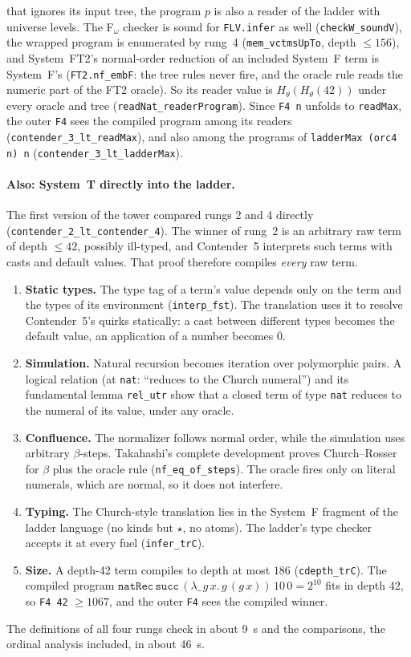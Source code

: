 \documentclass[11pt]{article}
\theoremstyle{definition}
\theoremstyle{remark}
\newcommand{\lean}[1]{\texttt{#1}}
\begin{document}
that ignores its input tree, the program $p$ is also a reader of the ladder
with universe levels. The F$_\omega$ checker is sound for \lean{FLV.infer} as
well (\lean{checkW\_soundV}), the wrapped program is enumerated by rung~4
(\lean{mem\_vctmsUpTo}, depth $\le156$), and System~FT2's normal-order reduction
of an included System~F term is System~F's (\lean{FT2.nf\_embF}: the tree rules
never fire, and the oracle rule reads the numeric part of the FT2 oracle). So
its reader value is $H_\theta(H_\theta(42))$ under every oracle and tree
(\lean{readNat\_readerProgram}). Since \lean{F4 n} unfolds to \lean{readMax},
the outer \lean{F4} sees the compiled program among its readers
(\lean{contender\_3\_lt\_readMax}), and also among the programs of
\lean{ladderMax (orc4 n) n} (\lean{contender\_3\_lt\_ladderMax}).

\paragraph{Also: System~T directly into the ladder.} The first version of the
tower compared rungs 2 and 4 directly (\lean{contender\_2\_lt\_contender\_4}).
The winner of rung~2 is an arbitrary raw term of depth $\le 42$, possibly
ill-typed, and Contender~5 interprets such terms with casts and default values.
That proof therefore compiles \emph{every} raw term.
\begin{enumerate}[leftmargin=*]
\item \textbf{Static types.} The type tag of a term's value depends only on
  the term and the types of its environment (\lean{interp\_fst}). The
  translation uses it to resolve Contender~5's quirks statically: a cast
  between different types becomes the default value, an application of a
  number becomes $\overline{0}$.
\item \textbf{Simulation.} Natural recursion becomes iteration over
  polymorphic pairs. A logical relation (at \lean{nat}: ``reduces to the
  Church numeral'') and its fundamental lemma \lean{rel\_utr} show that a
  closed term of type \lean{nat} reduces to the numeral of its value, under any
  oracle.
\item \textbf{Confluence.} The normalizer follows normal order, while the
  simulation uses arbitrary $\beta$-steps. Takahashi's complete development proves
  Church--Rosser for $\beta$ plus the oracle rule (\lean{nf\_eq\_of\_steps}). The
  oracle fires only on literal numerals, which are normal, so it does not
  interfere.
\item \textbf{Typing.} The Church-style translation lies in the System~F
  fragment of the ladder language (no kinds but $\star$, no atoms). The
  ladder's type checker accepts it at every fuel (\lean{infer\_trC}).
\item \textbf{Size.} A depth-42 term compiles to depth at most $186$
  (\lean{cdepth\_trC}). The compiled program
  $\mathtt{natRec}\,\mathtt{succ}\,(\lambda\_\,g\,x.\,g\,(g\,x))\,10\,0 = 2^{10}$
  fits in depth 42, so \lean{F4 42} $\ge 1067$, and the outer \lean{F4} sees
  the compiled winner.
\end{enumerate}
The definitions of all four rungs check in about 9~s and the comparisons,
the ordinal analysis included, in about 46~s.
\end{document}
